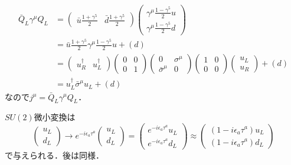 \begin{align*}
  \bar{Q}_L \gamma^\mu Q_L &=
  \begin{pmatrix}
    \bar{u} \frac{1+\gamma^5}{2} & \bar{d} \frac{1+\gamma^5}{2}
  \end{pmatrix}
  \begin{pmatrix}
    \gamma^\mu \frac{1-\gamma^5}{2} u \\ \gamma^\mu \frac{1-\gamma^5}{2} d
  \end{pmatrix}
  \\
  &= \bar{u} \frac{1+\gamma^5}{2} \gamma^\mu \frac{1-\gamma^5}{2} u + (d) \\
  &=
  \begin{pmatrix}
    u_R^\dagger & u_L^\dagger
  \end{pmatrix}
  \begin{pmatrix}
    0 & 0 \\ 0 & 1
  \end{pmatrix}
  \begin{pmatrix}
    0 & \sigma^\mu \\ \bar\sigma^\mu & 0
  \end{pmatrix}
  \begin{pmatrix}
    1 & 0 \\ 0 & 0
  \end{pmatrix}
  \begin{pmatrix}
    u_L \\ u_R
  \end{pmatrix}
  + (d) \\
  &= u_L^\dagger \bar\sigma^\mu u_L + (d)
\end{align*}
なので$j^\mu = \bar{Q}_L \gamma^\mu Q_L$．

$SU(2)$微小変換は
\[
\begin{pmatrix}
  u_L \\ d_L
\end{pmatrix}
\to e^{-i\epsilon_a \tau^a}
\begin{pmatrix}
  u_L \\ d_L
\end{pmatrix}
=
\begin{pmatrix}
  e^{-i\epsilon_a \tau^a} u_L \\ e^{-i\epsilon_a \tau^a} d_L
\end{pmatrix}
\approx
\begin{pmatrix}
  (1-i\epsilon_a \tau^a) u_L \\ (1-i\epsilon_a \tau^a) d_L
\end{pmatrix}
\]
で与えられる．後は同様．

